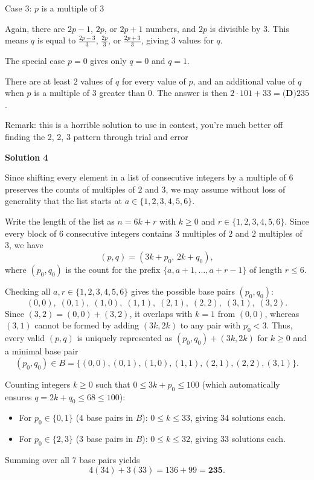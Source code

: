 \begin{enumerate}
 
Case 3: $p$ is a multiple of $3$

 Again, there are $2p-1$, $2p$, or $2p+1$ numbers, and $2p$ is divisible by $3$. This means $q$ is equal to $\frac{2p-3}{3}$, $\frac{2p}{3}$, or $\frac{2p+3}{3}$, giving $3$ values for $q$.

 
The special case $p=0$ gives only $q=0$ and $q=1$.

 
There are at least $2$ values of $q$ for every value of $p$, and an additional value of $q$ when $p$ is a multiple of $3$ greater than $0$. The answer is then $2 \cdot 101 + 33 = \boxed{\textbf{(D)} 235}$.

 Remark: this is a horrible solution to use in contest, you’re much better off finding the 2, 2, 3 pattern through trial and error

 



\textbf{Solution 4}

Since shifting every element in a list of consecutive integers by a multiple of $6$ preserves the counts of multiples of $2$ and $3$, we may assume without loss of generality that the list starts at $a \in \{1, 2, 3, 4, 5, 6\}$.

 Write the length of the list as $n = 6k + r$ with $k \geq 0$ and $r \in \{1, 2, 3, 4, 5, 6\}$. Since every block of $6$ consecutive integers contains $3$ multiples of $2$ and $2$ multiples of $3$, we have
 \[(p, q) = (3k + p_0, \, 2k + q_0),\]where $(p_0, q_0)$ is the count for the prefix $\{a, a+1, \dots, a+r-1\}$ of length $r \leq 6$.

 Checking all $a, r \in \{1, 2, 3, 4, 5, 6\}$ gives the possible base pairs $(p_0, q_0)$:
 \[(0,0),\; (0,1),\; (1,0),\; (1,1),\; (2,1),\; (2,2),\; (3,1),\; (3,2).\]Since $(3,2) = (0,0) + (3,2)$, it overlaps with $k=1$ from $(0,0)$, whereas $(3,1)$ cannot be formed by adding $(3k, 2k)$ to any pair with $p_0 < 3$. Thus, every valid $(p, q)$ is uniquely represented as $(p_0, q_0) + (3k, 2k)$ for $k \geq 0$ and a minimal base pair
 \[(p_0, q_0) \in B = \{(0,0), (0,1), (1,0), (1,1), (2,1), (2,2), (3,1)\}.\]

 Counting integers $k \geq 0$ such that $0 \leq 3k + p_0 \leq 100$ (which automatically ensures $q = 2k + q_0 \leq 68 \leq 100$):

 
            \begin{itemize}
        \item For $p_0 \in \{0, 1\}$ ($4$ base pairs in $B$): $0 \leq k \leq 33$, giving $34$ solutions each.
        \item For $p_0 \in \{2, 3\}$ ($3$ base pairs in $B$): $0 \leq k \leq 32$, giving $33$ solutions each.
            \end{itemize}
            Summing over all $7$ base pairs yields
 \[4(34) + 3(33) = 136 + 99 = \mathbf{235}.\]





\end{enumerate}
